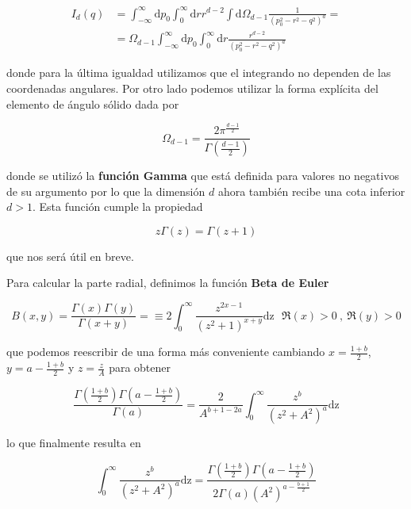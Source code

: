 \documentclass[tickz]{article}
\numberwithin{equation}{section}
\begin{document}
\begin{equation}\label{auxRD}
\begin{aligned}
I_d(q)&=\int_{-\infty}^{\infty}\mathrm{d}p_0\int_{0}^{\infty} \mathrm{d}r r^{d-2}  \int \mathrm{d} \Omega_{d-1} \frac{1}{\left(p_0^2 - r^2 -q^2\right)^a}=\\
&=\Omega_{d-1} \int_{-\infty}^{\infty}\mathrm{d}p_0\int_{0}^{\infty}\mathrm{d}r \frac{r^{d-2}}{\left(p_0^2 - r^2 -q^2\right)^a}
\end{aligned}
\end{equation}

donde para la última igualdad utilizamos que el integrando no dependen de las coordenadas angulares. Por otro lado podemos utilizar la forma explícita del elemento de ángulo sólido dada por

\begin{equation}\label{angulosolido}
\Omega_{d-1} = \frac{2 \pi^{\frac{d-1}{2}}}{\Gamma (\frac{d-1}{2})}
\end{equation}

donde se utilizó la \textbf{función Gamma} que está definida para valores no negativos de su argumento por lo que la dimensión $ d $ ahora también recibe una cota inferior $ d>1 $. Esta función cumple la propiedad 

\begin{equation}\label{key}
z \Gamma(z)= \Gamma(z+1)
\end{equation} 

que nos será útil en breve.

Para calcular la parte radial, definimos la función \textbf{Beta de Euler}

\begin{equation}\label{betaeuler}
B(x,y)=\frac{\Gamma(x) \Gamma(y)}{\Gamma(x+y)} = \equiv 2 \int_0^{\infty} \frac{z^{2x-1}}{(z^2+1)^{x+y}}\mathrm{dz} \ \ \ \Re(x)>0 \ , \ \Re(y)>0
\end{equation}

que podemos reescribir de una forma más conveniente cambiando $ x=\frac{1+b}{2} $, $ y=a - \frac{1+b}{2} $ y $ z=\frac{z}{A} $ para obtener

\begin{equation}
\frac{\Gamma(\frac{1+b}{2}) \Gamma(a - \frac{1+b}{2})}{\Gamma(a)} =\frac{2}{A^{b+1-2a}} \int_0^{\infty} \frac{z^b}{(z^2+A^2)^a}\mathrm{dz}
\end{equation}

lo que finalmente resulta en 

\begin{equation}\label{betaeuler2}
\int_0^{\infty} \frac{z^b}{(z^2+A^2)^a}\mathrm{dz} = \frac{\Gamma(\frac{1+b}{2}) \Gamma(a - \frac{1+b}{2})}{2 \Gamma(a) (A^2)^{a-\frac{b+1}{2}}} 
\end{equation}
\end{document}
